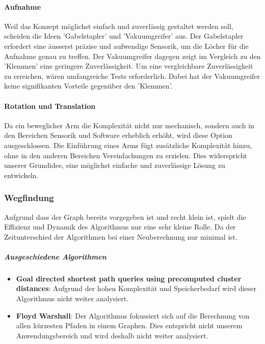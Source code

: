 \documentclass[../main.tex]{subfiles}
\begin{document}
        \paragraph{Aufnahme}
        Weil das Konzept möglichst einfach und zuverlässig gestaltet werden soll, scheiden die Ideen 'Gabelstapler' und 'Vakuumgreifer' aus. Der Gabelstapler erfordert eine äusserst präzise und aufwendige Sensorik, um die Löcher für die Aufnahme genau zu treffen. Der Vakuumgreifer dagegen zeigt im Vergleich zu den 'Klemmen' eine geringere Zuverlässigkeit. Um eine vergleichbare Zuverlässigkeit zu erreichen, wären umfangreiche Tests erforderlich. Dabei hat der Vakuumgreifer  keine signifikanten Vorteile gegenüber den 'Klemmen'.
        
        \paragraph{Rotation und Translation}
        Da ein beweglicher Arm die Komplexität nicht nur mechanisch, sondern auch in den Bereichen Sensorik und Software erheblich erhöht, wird diese Option ausgeschlossen. Die Einführung eines Arms fügt zusätzliche Komplexität hinzu, ohne in den anderen Bereichen Vereinfachungen zu erzielen. Dies widerspricht unserer Grundidee, eine möglichst einfache und zuverlässige Lösung zu entwickeln.



\newpage
\subsubsection{Wegfindung}

Aufgrund dass der Graph bereits vorgegeben ist und recht klein ist, spielt die Effizienz und Dynamik des Algorithmus nur eine sehr kleine Rolle. Da der Zeitunterschied der Algorithmen bei einer Neuberechnung nur minimal ist.

\subparagraph{Ausgeschiedene Algorithmen}

\begin{itemize}
    \item \textbf{Goal directed shortest path queries using precomputed cluster distances}: Aufgrund der hohen Komplexität und Speicherbedarf wird dieser Algorithmus nicht weiter analysiert.
    \item \textbf{Floyd Warshall}: Der Algorithmus fokussiert sich auf die Berechnung von allen kürzesten Pfaden in einem Graphen. Dies entspricht nicht unserem Anwendungsbereich und wird deshalb nicht weiter analysiert.
\end{itemize}
\end{document}
